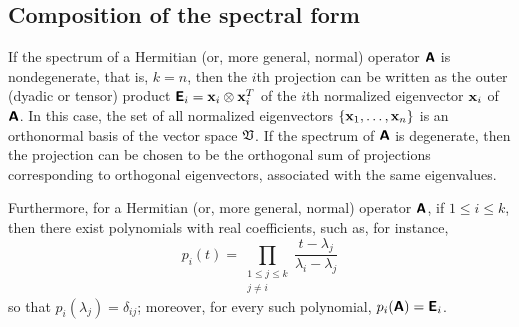 \subsection{Composition of the spectral form}

If the spectrum of a  Hermitian (or, more general, normal) operator $\textsf{\textbf{A}}$ is nondegenerate, that is, $k=n$, then the
$i$th projection
can be written as the outer (dyadic or tensor) product
$
\textsf{\textbf{E}}_i={\bf x}_i \otimes {\bf x}_i^T$
of the $i$th normalized eigenvector ${\bf x}_i $ of $\textsf{\textbf{A}}$.
In this case, the set of all normalized eigenvectors $\{{\bf x}_1, \ldots ,{\bf x}_n\}$ is an orthonormal basis of the vector space $\frak V$.
If the spectrum of $\textsf{\textbf{A}}$ is degenerate, then the projection can be chosen to be the orthogonal sum of projections
corresponding to orthogonal eigenvectors, associated with the same  eigenvalues.

Furthermore, for a  Hermitian (or, more general, normal) operator $\textsf{\textbf{A}}$,
if $1\le i \le k$,
then there exist polynomials with real coefficients, such as,  for instance,
\begin{equation}
p_i  (t)
=
\prod_{
\begin{array}{c}
1\le j\le k\\
j\neq i
\end{array}
}
\frac{t-\lambda_j}{\lambda_i -\lambda_j}
\label{2011-m-epsf}
\end{equation}
so that
$p_i(\lambda_j) =\delta_{ij}$;
moreover, for every such polynomial,
$p_i(\textsf{\textbf{A}})=\textsf{\textbf{E}}_i$.

